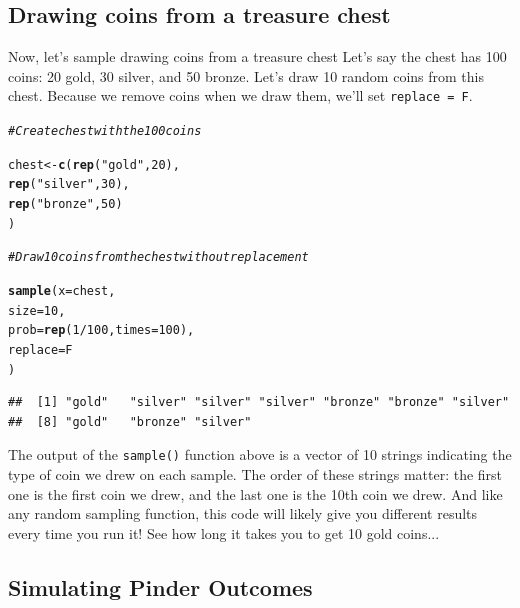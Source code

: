 \documentclass{tufte-book}\usepackage[]{graphicx}\usepackage[]{color}
\makeatletter
\newcommand{\hlnum}[1]{\textcolor[rgb]{0.686,0.059,0.569}{#1}}%
\newcommand{\hlstr}[1]{\textcolor[rgb]{0.192,0.494,0.8}{#1}}%
\newcommand{\hlcom}[1]{\textcolor[rgb]{0.678,0.584,0.686}{\textit{#1}}}%
\newcommand{\hlopt}[1]{\textcolor[rgb]{0,0,0}{#1}}%
\newcommand{\hlstd}[1]{\textcolor[rgb]{0.345,0.345,0.345}{#1}}%
\newcommand{\hlkwb}[1]{\textcolor[rgb]{0.69,0.353,0.396}{#1}}%
\newcommand{\hlkwc}[1]{\textcolor[rgb]{0.333,0.667,0.333}{#1}}%
\newcommand{\hlkwd}[1]{\textcolor[rgb]{0.737,0.353,0.396}{\textbf{#1}}}%
\newenvironment{kframe}{%
 \def\at@end@of@kframe{}%
 \ifinner\ifhmode%
  \def\at@end@of@kframe{\end{minipage}}%
  \begin{minipage}{\columnwidth}%
 \fi\fi%
 \def\FrameCommand##1{\hskip\@totalleftmargin \hskip-\fboxsep
 \colorbox{shadecolor}{##1}\hskip-\fboxsep
     \hskip-\linewidth \hskip-\@totalleftmargin \hskip\columnwidth}%
 \MakeFramed {\advance\hsize-\width
   \@totalleftmargin\z@ \linewidth\hsize
   \@setminipage}}%
 {\par\unskip\endMakeFramed%
 \at@end@of@kframe}
\newenvironment{knitrout}{}{} %
\makeatother
\begin{document}
\subsection{Drawing coins from a treasure chest}

Now, let's sample drawing coins from a treasure chest Let's say the chest has 100 coins: 20 gold, 30 silver, and 50 bronze. Let's draw 10 random coins from this chest. Because we remove coins when we draw them, we'll set \texttt{replace = F}.

\begin{knitrout}
\color{fgcolor}\begin{kframe}
\begin{alltt}
\hlcom{# Create chest with the 100 coins}

\hlstd{chest} \hlkwb{<-} \hlkwd{c}\hlstd{(}\hlkwd{rep}\hlstd{(}\hlstr{"gold"}\hlstd{,} \hlnum{20}\hlstd{),}
         \hlkwd{rep}\hlstd{(}\hlstr{"silver"}\hlstd{,} \hlnum{30}\hlstd{),}
         \hlkwd{rep}\hlstd{(}\hlstr{"bronze"}\hlstd{,} \hlnum{50}\hlstd{)}
         \hlstd{)}

\hlcom{# Draw 10 coins from the chest without replacement}

\hlkwd{sample}\hlstd{(}\hlkwc{x} \hlstd{= chest,}
       \hlkwc{size} \hlstd{=} \hlnum{10}\hlstd{,}
       \hlkwc{prob} \hlstd{=} \hlkwd{rep}\hlstd{(}\hlnum{1} \hlopt{/} \hlnum{100}\hlstd{,} \hlkwc{times} \hlstd{=} \hlnum{100}\hlstd{),}
       \hlkwc{replace} \hlstd{= F}
       \hlstd{)}
\end{alltt}
\begin{verbatim}
##  [1] "gold"   "silver" "silver" "silver" "bronze" "bronze" "silver"
##  [8] "gold"   "bronze" "silver"
\end{verbatim}
\end{kframe}
\end{knitrout}

The output of the \texttt{sample()} function above is a vector of 10 strings indicating the type of coin we drew on each sample. The order of these strings matter: the first one is the first coin we drew, and the last one is the 10th coin we drew. And like any random sampling function, this code will likely give you different results every time you run it! See how long it takes you to get 10 gold coins...

\subsection{Simulating Pinder Outcomes}
\end{document}
